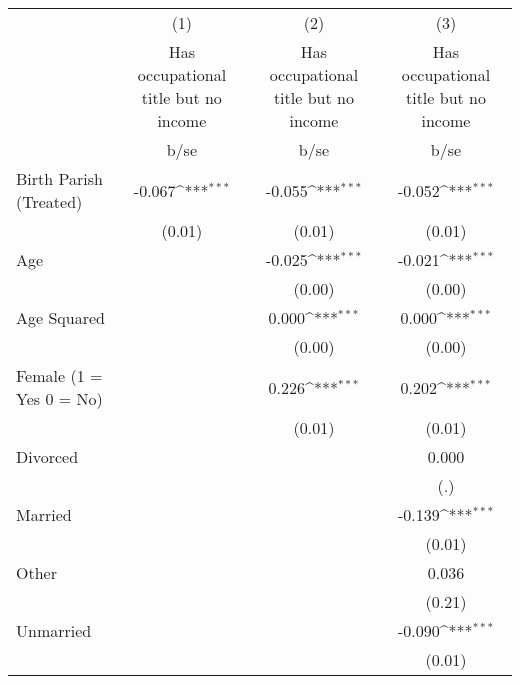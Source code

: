 {
\def\sym#1{\ifmmode^{#1}\else\(^{#1}\)\fi}
\begin{tabular}{l*{3}{c}}
\hline\hline
                    &\multicolumn{1}{c}{(1)}&\multicolumn{1}{c}{(2)}&\multicolumn{1}{c}{(3)}\\
                    &\multicolumn{1}{c}{Has occupational title but no income}&\multicolumn{1}{c}{Has occupational title but no income}&\multicolumn{1}{c}{Has occupational title but no income}\\
                    &        b/se         &        b/se         &        b/se         \\
\hline
Birth Parish (Treated)&      -0.067\sym{***}&      -0.055\sym{***}&      -0.052\sym{***}\\
                    &      (0.01)         &      (0.01)         &      (0.01)         \\
Age                 &                     &      -0.025\sym{***}&      -0.021\sym{***}\\
                    &                     &      (0.00)         &      (0.00)         \\
Age Squared         &                     &       0.000\sym{***}&       0.000\sym{***}\\
                    &                     &      (0.00)         &      (0.00)         \\
Female (1 = Yes 0 = No)&                     &       0.226\sym{***}&       0.202\sym{***}\\
                    &                     &      (0.01)         &      (0.01)         \\
Divorced            &                     &                     &       0.000         \\
                    &                     &                     &         (.)         \\
Married             &                     &                     &      -0.139\sym{***}\\
                    &                     &                     &      (0.01)         \\
Other               &                     &                     &       0.036         \\
                    &                     &                     &      (0.21)         \\
Unmarried           &                     &                     &      -0.090\sym{***}\\
                    &                     &                     &      (0.01)         \\

\end{tabular}}
